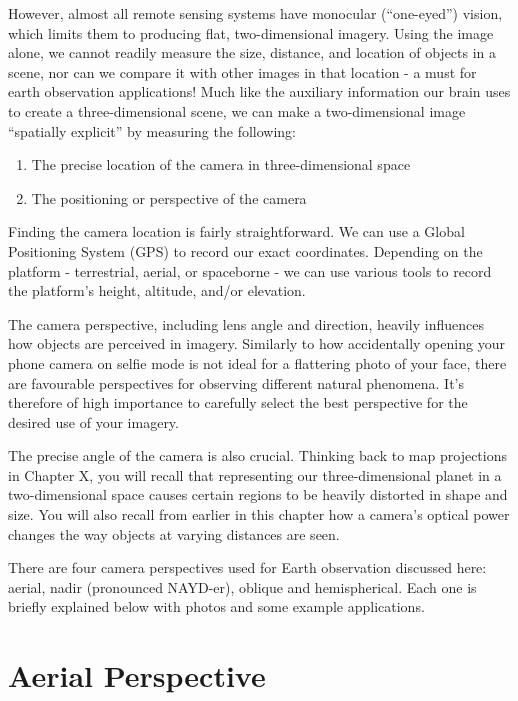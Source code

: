 \documentclass[
]{book}
\providecommand{\tightlist}{%
  \setlength{\itemsep}{0pt}\setlength{\parskip}{0pt}}
\begin{document}
However, almost all remote sensing systems have monocular (``one-eyed'') vision, which limits them to producing flat, two-dimensional imagery. Using the image alone, we cannot readily measure the size, distance, and location of objects in a scene, nor can we compare it with other images in that location - a must for earth observation applications! Much like the auxiliary information our brain uses to create a three-dimensional scene, we can make a two-dimensional image ``spatially explicit'' by measuring the following:

\begin{enumerate}
\def\labelenumi{\arabic{enumi}.}
\tightlist
\item
  The precise location of the camera in three-dimensional space
\item
  The positioning or perspective of the camera
\end{enumerate}

Finding the camera location is fairly straightforward. We can use a Global Positioning System (GPS) to record our exact coordinates. Depending on the platform - terrestrial, aerial, or spaceborne - we can use various tools to record the platform's height, altitude, and/or elevation.

The camera perspective, including lens angle and direction, heavily influences how objects are perceived in imagery. Similarly to how accidentally opening your phone camera on selfie mode is not ideal for a flattering photo of your face, there are favourable perspectives for observing different natural phenomena. It's therefore of high importance to carefully select the best perspective for the desired use of your imagery.

The precise angle of the camera is also crucial. Thinking back to map projections in Chapter X, you will recall that representing our three-dimensional planet in a two-dimensional space causes certain regions to be heavily distorted in shape and size. You will also recall from earlier in this chapter how a camera's optical power changes the way objects at varying distances are seen.

There are four camera perspectives used for Earth observation discussed here: aerial, nadir (pronounced NAYD-er), oblique and hemispherical. Each one is briefly explained below with photos and some example applications.

\hypertarget{aerial-perspective}{%
\section{Aerial Perspective}\label{aerial-perspective}}
\end{document}
